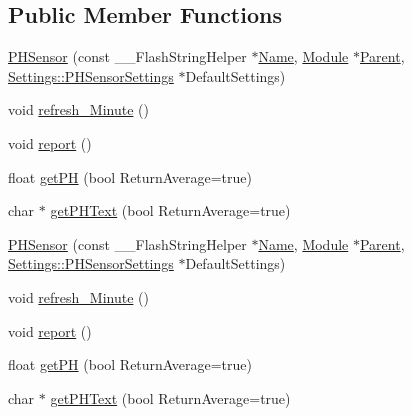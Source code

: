 \subsection*{Public Member Functions}
\begin{DoxyCompactItemize}
\item 
\hyperlink{class_p_h_sensor_afe168dbbb29e3ecda521de4ef47ad6ee}{P\+H\+Sensor} (const \+\_\+\+\_\+\+Flash\+String\+Helper $\ast$\hyperlink{class_common_aeea91a726dbe988e515057b32ba0726f}{Name}, \hyperlink{class_module}{Module} $\ast$\hyperlink{class_p_h_sensor_ac969f556dfd81281095f4b3af97105c6}{Parent}, \hyperlink{struct_settings_1_1_p_h_sensor_settings}{Settings\+::\+P\+H\+Sensor\+Settings} $\ast$Default\+Settings)
\item 
void \hyperlink{class_p_h_sensor_a0cb40466ff35d33b729960b339f608ce}{refresh\+\_\+\+Minute} ()
\item 
void \hyperlink{class_p_h_sensor_af9730aece2d3bcb71ac9d4f1e6f96f1e}{report} ()
\item 
float \hyperlink{class_p_h_sensor_ad277a03459aff975ad61039dfe22635d}{get\+PH} (bool Return\+Average=true)
\item 
char $\ast$ \hyperlink{class_p_h_sensor_afa1a5158732cd57ffb41ae089bf8850f}{get\+P\+H\+Text} (bool Return\+Average=true)
\item 
\hyperlink{class_p_h_sensor_afe168dbbb29e3ecda521de4ef47ad6ee}{P\+H\+Sensor} (const \+\_\+\+\_\+\+Flash\+String\+Helper $\ast$\hyperlink{class_common_aeea91a726dbe988e515057b32ba0726f}{Name}, \hyperlink{class_module}{Module} $\ast$\hyperlink{class_p_h_sensor_ac969f556dfd81281095f4b3af97105c6}{Parent}, \hyperlink{struct_settings_1_1_p_h_sensor_settings}{Settings\+::\+P\+H\+Sensor\+Settings} $\ast$Default\+Settings)
\item 
void \hyperlink{class_p_h_sensor_a0cb40466ff35d33b729960b339f608ce}{refresh\+\_\+\+Minute} ()
\item 
void \hyperlink{class_p_h_sensor_af9730aece2d3bcb71ac9d4f1e6f96f1e}{report} ()
\item 
float \hyperlink{class_p_h_sensor_ad277a03459aff975ad61039dfe22635d}{get\+PH} (bool Return\+Average=true)
\item 
char $\ast$ \hyperlink{class_p_h_sensor_a4ea187ef097a55404e3cb3dbd8214cc0}{get\+P\+H\+Text} (bool Return\+Average=true)
\end{DoxyCompactItemize}
